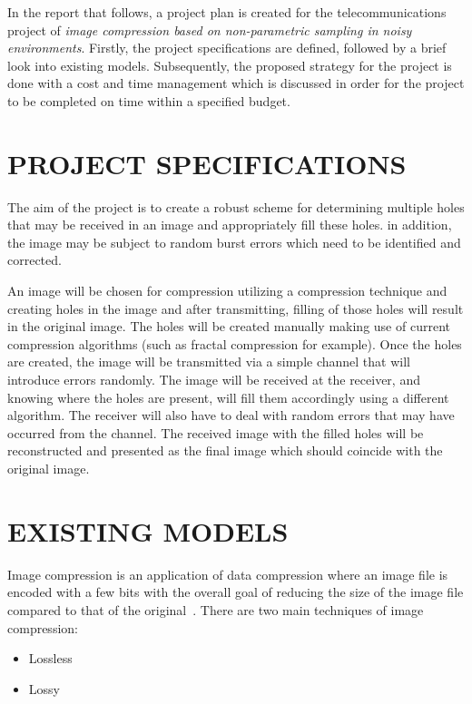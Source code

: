 \documentclass[10pt,twocolumn]{witseiepaper}
\begin{document}
In the report that follows, a project plan is created for the telecommunications project of \emph{image compression based on non-parametric sampling in noisy environments}. Firstly, the project specifications are defined, followed by a brief look into existing models. Subsequently, the proposed strategy for the project is done with a cost and time management which is discussed in order for the project to be completed on time within a specified budget.

%
\section{PROJECT SPECIFICATIONS}
\label{sec: Project Specs}
The aim of the project is to create a robust scheme for determining multiple holes that may be received in an image and appropriately fill these holes. in addition, the image may be subject to random burst errors which need to be identified and corrected.

An image will be chosen for compression utilizing a compression technique and creating holes in the image and after transmitting, filling of those holes will result in the original image. The holes will be created manually making use of current compression algorithms (such as fractal compression for example). Once the holes are created, the image will be transmitted via a simple channel that will introduce errors randomly. The image will be received at the receiver, and knowing where the holes are present, will fill them accordingly using a different algorithm. The receiver will also have to deal with random errors that may have occurred from the channel. The received image with the filled holes will be reconstructed and presented as the final image which should coincide with the original image.

%
\section{EXISTING MODELS}
\label{sec: Existing Models}
Image compression is an application of data compression where an image file is encoded with a few bits with the overall goal of reducing the size of the image file compared to that of the original~\cite{ImageComp}. There are two main techniques of image compression:
\begin{itemize}
\item Lossless
\item Lossy
\end{itemize}
\end{document}
